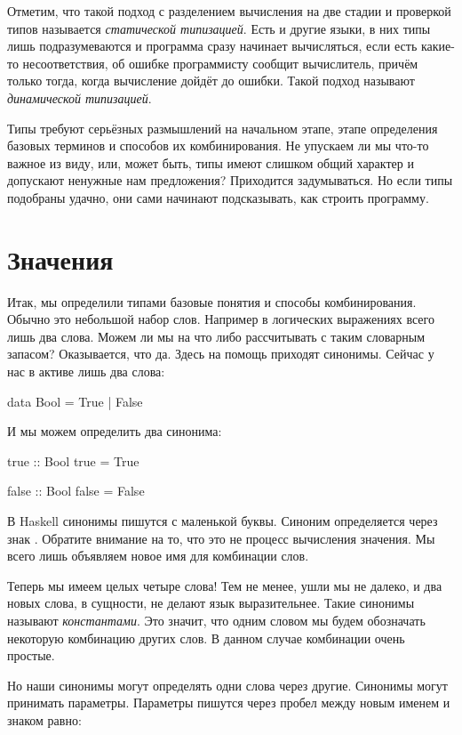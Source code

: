 Отметим, что такой подход с разделением вычисления на две стадии и
проверкой типов называется \emph{статической типизацией}. Есть и другие
языки, в них типы лишь подразумеваются и программа сразу начинает
вычисляться, если есть какие-то несоответствия, об ошибке программисту
сообщит вычислитель, причём только тогда, когда вычисление дойдёт до
ошибки. Такой подход называют \emph{динамической типизацией}.

Типы требуют серьёзных размышлений на начальном этапе, этапе определения
базовых терминов и способов их комбинирования. Не упускаем ли мы что-то
важное из виду, или, может быть, типы имеют слишком общий характер и
допускают ненужные нам предложения? Приходится задумываться. Но если
типы подобраны удачно, они сами начинают подсказывать, как строить
программу.

\section{Значения}

Итак, мы определили типами базовые понятия и способы комбинирования.
Обычно это небольшой набор слов. Например в логических выражениях всего
лишь два слова. Можем ли мы на что либо рассчитывать с таким словарным
запасом? Оказывается, что да. Здесь на помощь приходят синонимы. Сейчас
у нас в активе лишь два слова:


\begin{code}
data Bool = True | False
\end{code}

И мы можем определить два синонима:


\begin{code}
true :: Bool
true = True

false :: Bool
false = False
\end{code}

В Haskell синонимы пишутся с маленькой буквы. Синоним определяется через
знак \In{=}. Обратите внимание на то, что это не процесс вычисления
значения. Мы всего лишь объявляем новое имя для комбинации слов.

Теперь мы имеем целых четыре слова! Тем не менее, ушли мы не далеко, и
два новых слова, в сущности, не делают язык выразительнее. Такие
синонимы называют \emph{константами}. Это значит, что одним словом мы
будем обозначать некоторую комбинацию других слов. В данном случае
комбинации очень простые.

Но наши синонимы могут определять одни слова через другие. Синонимы
могут принимать параметры. Параметры пишутся через пробел между новым
именем и знаком равно:


